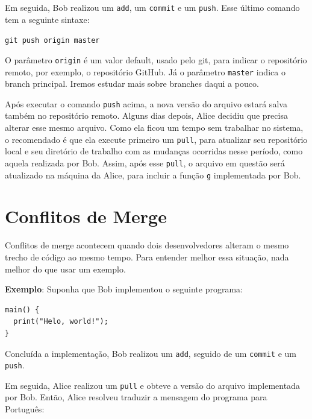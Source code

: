 \documentclass[
  11pt,
  twoside]{book}
\newcommand{\passthrough}[1]{#1}
\begin{document}
Em seguida, Bob realizou um \passthrough{\lstinline!add!}, um
\passthrough{\lstinline!commit!} e um \passthrough{\lstinline!push!}.
Esse último comando tem a seguinte sintaxe:

\passthrough{\lstinline!git push origin master!}

O parâmetro \passthrough{\lstinline!origin!} é um valor default, usado
pelo git, para indicar o repositório remoto, por exemplo, o repositório
GitHub. Já o parâmetro \passthrough{\lstinline!master!} indica o branch
principal. Iremos estudar mais sobre branches daqui a pouco.

Após executar o comando \passthrough{\lstinline!push!} acima, a nova
versão do arquivo estará salva também no repositório remoto. Alguns dias
depois, Alice decidiu que precisa alterar esse mesmo arquivo. Como ela
ficou um tempo sem trabalhar no sistema, o recomendado é que ela execute
primeiro um \passthrough{\lstinline!pull!}, para atualizar seu
repositório local e seu diretório de trabalho com as mudanças ocorridas
nesse período, como aquela realizada por Bob. Assim, após esse
\passthrough{\lstinline!pull!}, o arquivo em questão será atualizado na
máquina da Alice, para incluir a função \passthrough{\lstinline!g!}
implementada por Bob.

\hypertarget{conflitos-de-merge}{%
\section{Conflitos de Merge}\label{conflitos-de-merge}}

 

Conflitos de merge acontecem quando dois desenvolvedores alteram o mesmo
trecho de código ao mesmo tempo. Para entender melhor essa situação,
nada melhor do que usar um exemplo.

\textbf{Exemplo}: Suponha que Bob implementou o seguinte programa:

\begin{lstlisting}
main() {
  print("Helo, world!");
}
\end{lstlisting}

Concluída a implementação, Bob realizou um
\passthrough{\lstinline!add!}, seguido de um
\passthrough{\lstinline!commit!} e um \passthrough{\lstinline!push!}.

Em seguida, Alice realizou um \passthrough{\lstinline!pull!} e obteve a
versão do arquivo implementada por Bob. Então, Alice resolveu traduzir a
mensagem do programa para Português:
\end{document}
